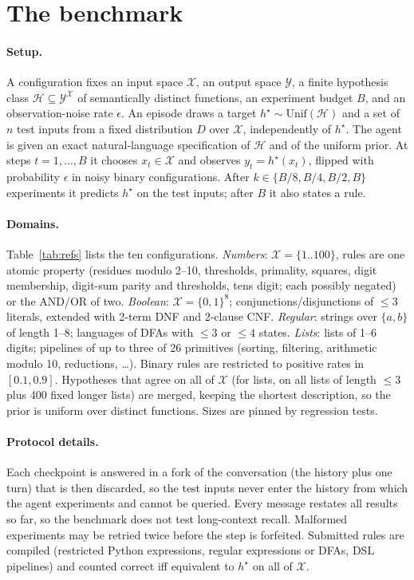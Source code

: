 \documentclass[11pt]{article}
\newcommand{\Hs}{\mathcal{H}}
\newcommand{\X}{\mathcal{X}}
\newcommand{\Y}{\mathcal{Y}}
\begin{document}
\section{The benchmark}\label{sec:bench}

\paragraph{Setup.} A configuration fixes an input space $\X$, an output space $\Y$, a finite hypothesis
class $\Hs \subseteq \Y^{\X}$ of semantically distinct functions, an experiment budget $B$, and an
observation-noise rate $\epsilon$. An episode draws a target $h^\star \sim \mathrm{Unif}(\Hs)$ and a
set of $n$ test inputs from a fixed distribution $D$ over $\X$, independently of $h^\star$. The agent is
given an exact natural-language specification of $\Hs$ and of the uniform prior. At steps
$t=1,\dots,B$ it chooses $x_t\in\X$ and observes $y_t = h^\star(x_t)$, flipped with probability
$\epsilon$ in noisy binary configurations. After $k\in\{B/8,B/4,B/2,B\}$ experiments it predicts
$h^\star$ on the test inputs; after $B$ it also states a rule.

\paragraph{Domains.} Table~\ref{tab:refs} lists the ten configurations. \emph{Numbers}: $\X=\{1..100\}$,
rules are one atomic property (residues modulo 2--10, thresholds, primality, squares, digit
membership, digit-sum parity and thresholds, tens digit; each possibly negated) or the AND/OR of two.
\emph{Boolean}: $\X=\{0,1\}^8$; conjunctions/disjunctions of $\le 3$ literals, extended with 2-term DNF
and 2-clause CNF. \emph{Regular}: strings over $\{a,b\}$ of length 1--8; languages of DFAs with $\le 3$
or $\le 4$ states. \emph{Lists}: lists of 1--6 digits; pipelines of up to three of 26 primitives
(sorting, filtering, arithmetic modulo 10, reductions, \dots). Binary rules are restricted to positive
rates in $[0.1,0.9]$. Hypotheses that agree on all of $\X$ (for lists, on all lists of length $\le 3$
plus 400 fixed longer lists) are merged, keeping the shortest description, so the prior is uniform
over distinct functions. Sizes are pinned by regression tests.

\paragraph{Protocol details.} Each checkpoint is answered in a fork of the conversation (the history
plus one turn) that is then discarded, so the test inputs never enter the history from which the agent
experiments and cannot be queried. Every message restates all results so far, so the benchmark does not
test long-context recall. Malformed experiments may be retried twice before the step is forfeited.
Submitted rules are compiled (restricted Python expressions, regular expressions or DFAs, DSL
pipelines) and counted correct iff equivalent to $h^\star$ on all of $\X$.
\end{document}

